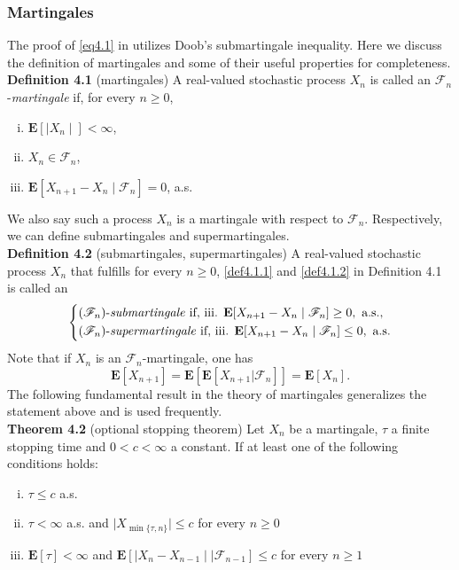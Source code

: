 \documentclass[
11pt, %
a4paper, %
oneside, %
headinclude,footinclude, %
BCOR5mm, %
]{scrartcl}
\begin{document}
\subsubsection{Martingales}
The proof of \eqref{eq4.1} in \cite{drewitz2014introduction} utilizes Doob's submartingale inequality. Here we discuss the definition of martingales and some of their useful properties for completeness.
\vspace{0.6em}\\\textbf{Definition 4.1} (martingales) A real-valued stochastic process $X_n$ is called an $\mathscr{F}_n$-\textit{martingale} if, for every $n \geq 0$,
\begin{enumerate}[i.]
    \item \label{def4.1.1} $\mathbf{E}[\mid X_n\mid]<\infty$,
    \item \label{def4.1.2}$X_n \in \mathscr{F}_n$,
    \item $\mathbf{E}[X_{n+1}-X_n\mid \mathscr{F}_n]=0$, a.s.
\end{enumerate}
We also say such a process $X_n$ is a martingale with respect to $\mathscr{F}_n$. 
Respectively, we can define submartingales and supermartingales. 
\vspace{0.6em}\\\textbf{Definition 4.2} (submartingales, supermartingales) A real-valued stochastic process $X_n$ that fulfills for every $n \geq 0$, \ref{def4.1.1} and \ref{def4.1.2} in Definition 4.1 is called an
\begin{equation}\left\{
\begin{aligned}
    &(\mathscr{F}_n) \text{-\textit{submartingale} if, iii. } \mathbf{E}[X_{n+1}-X_n\mid \mathscr{F}_n] \geq 0, \text{ a.s.}, \notag \\
    &(\mathscr{F}_n) \text{-\textit{supermartingale} if, iii. } \mathbf{E}[X_{n+1}-X_n\mid \mathscr{F}_n] \leq 0, \text{ a.s.} \notag
\end{aligned}\right.
\end{equation}
Note that if $X_n$ is an $\mathscr{F}_n$-martingale, one has
$$
 \mathbf{E}[X_{n+1}]=\mathbf{E}[\mathbf{E}[X_{n+1}| \mathscr{F}_n]]=\mathbf{E}[X_n].
$$
The following fundamental result in the theory of martingales generalizes the statement above and is used frequently.
\vspace{0.6em}\\\textbf{Theorem 4.2} (optional stopping theorem) Let $X_n$ be a martingale, $\tau$ a finite stopping time and $0<c<\infty$ a constant. If at least one of the following conditions holds:
\begin{enumerate}[i.]
    \item \label{thm4.1.1} $\tau \leq c$ a.s.
    \item \label{thm4.1.2} $\tau < \infty$ a.s. and $\mid X_{\min{\{ \tau, n\}}} \mid \leq c$ for every $n \geq 0$
    \item \label{thm4.1.3} $\mathbf{E}[\tau]<\infty$ and $\mathbf{E}[\mid X_n-X_{n-1} \mid \mid \mathscr{F}_{n-1}] \leq c$ for every $n \geq 1$
\end{enumerate}
\end{document}
